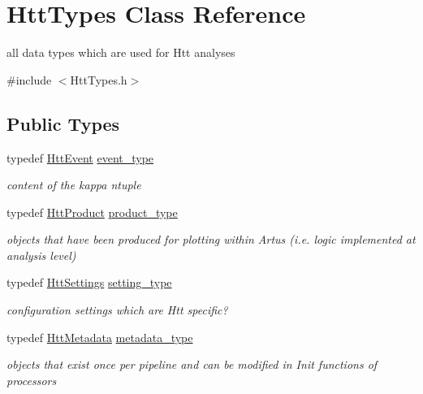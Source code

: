 \hypertarget{classHttTypes}{
\section{HttTypes Class Reference}
\label{classHttTypes}
}


all data types which are used for Htt analyses  


{\ttfamily \#include $<$HttTypes.h$>$}\subsection*{Public Types}
\begin{DoxyCompactItemize}
\item 
typedef \hyperlink{classHttEvent}{HttEvent} \hyperlink{classHttTypes_ad4519395b176ec8e6c98f2dfedb68b78}{event\_\-type}
\begin{DoxyCompactList}\small\item\em content of the kappa ntuple \item\end{DoxyCompactList}\item 
typedef \hyperlink{classHttProduct}{HttProduct} \hyperlink{classHttTypes_a498cba01b87a7d48dc0378323f41720c}{product\_\-type}
\begin{DoxyCompactList}\small\item\em objects that have been produced for plotting within Artus (i.e. logic implemented at analysis level) \item\end{DoxyCompactList}\item 
typedef \hyperlink{classHttSettings}{HttSettings} \hyperlink{classHttTypes_a25629547ad3af93af6e61b8bf62a160e}{setting\_\-type}
\begin{DoxyCompactList}\small\item\em configuration settings which are Htt specific? \item\end{DoxyCompactList}\item 
typedef \hyperlink{classHttMetadata}{HttMetadata} \hyperlink{classHttTypes_affda9644df5a8e5bf3a5aa6d02e5281b}{metadata\_\-type}
\begin{DoxyCompactList}\small\item\em objects that exist once per pipeline and can be modified in Init functions of processors \item\end{DoxyCompactList}\end{DoxyCompactItemize}



